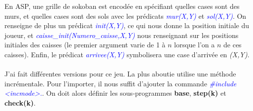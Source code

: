 \documentclass[12pt,a4paper]{article}
\begin{document}
En ASP, une grille de sokoban est encodée en spécifiant quelles cases sont des murs, et quelles cases sont des sols avec les prédicats \emph{\textcolor{blue}{mur(X,Y)}} et \emph{\textcolor{blue}{sol(X,Y)}}. On renseigne de plus un 
prédicat \emph{\textcolor{blue}{init(X,Y)}}, ce qui nous donne la position initiale du joueur, et \emph{\textcolor{blue}{caisse\_init(Numero\_caisse,X,Y)}} nous renseignant sur les positions initiales des caisses (le premier 
argument varie de 1 à $n$ lorsque l'on a $n$ de ces caisses). Enfin, le prédicat \emph{\textcolor{blue}{arrivee(X,Y)}} symbolisera une case d'arrivée en \emph{(X,Y)}.\\ \\
J'ai fait différentes versions pour ce jeu. La plus aboutie utilise une méthode incrémentale. Pour l'importer, il nous suffit d'ajouter la commande \emph{\textcolor{blue}{\#include \textless incmode\textgreater .}}. On doit alors 
définir les sous-programmes \textbf{base}, \textbf{step(k)} et \textbf{check(k)}.\\
\end{document}

